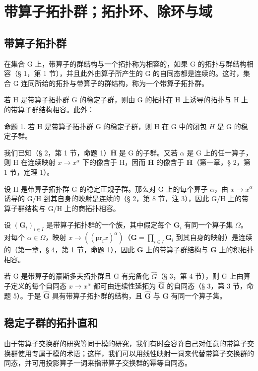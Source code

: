\section{带算子拓扑群；拓扑环、除环与域}

\subsection{带算子拓扑群}

在集合 G 上，带算子的群结构与一个拓扑称为相容的，如果 G 的拓扑与群结构相容（§ 1，第 1 节），并且此外由算子所产生的 G 的自同态都是连续的。这时，集合 G 连同所给的拓扑与带算子的群结构，称为一个带算子拓扑群。

若 H 是带算子拓扑群 G 的稳定子群，则由 G 的拓扑在 H 上诱导的拓扑与 H 上的带算子群结构相容。此外：

命题 1. 若 H 是带算子拓扑群 G 的稳定子群，则 H 在 G 中的闭包 \(\overline{H}\) 是 G 的稳定子群。

我们已知（§ 2，第 1 节，命题 1）\(\overline{\mathbf{H}}\) 是 G 的子群。又若 \(\alpha\) 是 G 上的任一算子，则 H 在连续映射 \(x \to x^{\alpha}\) 下的像含于 H，因而 \(\overline{\mathbf{H}}\) 的像含于 \(\overline{\mathbf{H}}\)（第一章，§ 2，第 1 节，定理 1）。

设 H 是带算子拓扑群 G 的稳定正规子群。那么对 G 上的每个算子 \(\alpha\)，由 \(x \rightarrow x^{\alpha}\) 诱导的 G/H 到其自身的映射是连续的（§ 2，第 8 节，注 3），因此 G/H 上的带算子群结构与 G/H 上的商拓扑相容。

设 \((\mathbf{G}_i)_{i\in I}\) 是带算子拓扑群的一个族，其中假定每个 \(\mathbf{G}_i\) 有同一个算子集 \(\Omega\)。对每个 \(\alpha \in \Omega\)，映射 \(x\to ((\mathrm{pr}_i x)^{\alpha})\)（\(\mathbf{G} = \prod_{i\in I}\mathbf{G}_i\) 到其自身的映射）是连续的（第一章，§ 4，第 1 节，命题 1），因此 \(\mathbf{G}\) 上的带算子群结构与 \(\mathbf{G}\) 上的积拓扑相容。

若 G 是带算子的豪斯多夫拓扑群且 G 有完备化 \(\hat{G}\)（§ 3，第 4 节），则 G 上由算子定义的每个自同态 \(x \to x^{\alpha}\) 都可由连续性延拓为 \(\hat{\mathbf{G}}\) 的自同态（§ 3，第 3 节，命题 5）。于是 \(\hat{\mathbf{G}}\) 具有带算子拓扑群的结构，且 \(\hat{\mathbf{G}}\) 与 \(\mathbf{G}\) 有同一个算子集。

\subsection{稳定子群的拓扑直和}

由于带算子交换群的研究等同于模的研究，我们有时会容许自己对任意的带算子交换群使用专属于模的术语；这样，我们可以用线性映射一词来代替带算子交换群的同态，并可用投影算子一词来指带算子交换群的幂等自同态。

